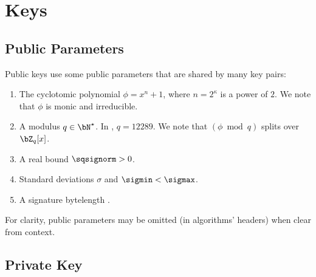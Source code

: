
\section{Keys} \label{sec:spec:keys}

\subsection{Public Parameters}

Public keys use some public parameters that are shared by many key
pairs:
\begin{enumerate}
\item The cyclotomic polynomial $\phi = x^n+1$, where $n = 2^\kappa$ is a power of $2$. We note that $\phi$ is monic and irreducible.
\item A modulus $q \in \bN^\star$. In \falcon, $q = 12289$. We note that $(\phi \bmod q)$ splits over $\bZ_q[x]$.
\item A real bound $\sqsignorm > 0$.
\item Standard deviations $\sigma$ and $\sigmin < \sigmax$.
\item A signature bytelength \sigbytelen.
\end{enumerate}

For clarity, public parameters may be omitted (\eg in algorithms' headers) when clear from context.


\subsection{Private Key}


